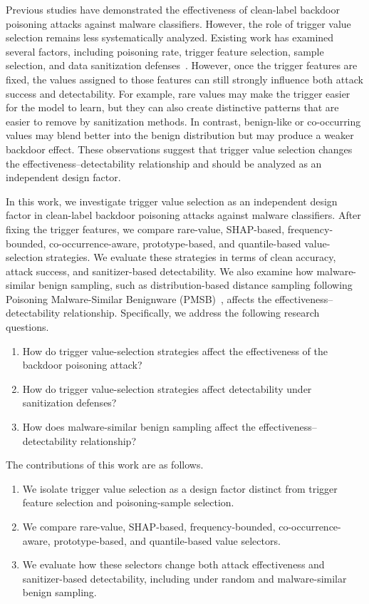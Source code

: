 Previous studies have demonstrated the effectiveness of clean-label backdoor poisoning attacks against malware classifiers. 
However, the role of trigger value selection remains less systematically analyzed. 
Existing work has examined several factors, including poisoning rate, trigger feature selection, sample selection, and data sanitization defenses~\cite{severi,ho_sanitization}.
However, once the trigger features are fixed, the values assigned to those features can still strongly influence both attack success and detectability.
For example, rare values may make the trigger easier for the model to learn, but they can also create distinctive patterns that are easier to remove by sanitization methods.
In contrast, benign-like or co-occurring values may blend better into the benign distribution but may produce a weaker backdoor effect.
These observations suggest that trigger value selection changes the effectiveness--detectability relationship and should be analyzed as an independent design factor.

In this work, we investigate trigger value selection as an independent design factor in clean-label backdoor poisoning attacks against malware classifiers.
After fixing the trigger features, we compare rare-value, SHAP-based, frequency-bounded, co-occurrence-aware, prototype-based, and quantile-based value-selection strategies.
We evaluate these strategies in terms of clean accuracy, attack success, and sanitizer-based detectability.
We also examine how malware-similar benign sampling, such as distribution-based distance sampling following Poisoning Malware-Similar Benignware (PMSB)~\cite{pmsb}, affects the effectiveness--detectability relationship.
Specifically, we address the following research questions.
\begin{enumerate}
    \item[RQ1)] How do trigger value-selection strategies affect the effectiveness of the backdoor poisoning attack?
    \item[RQ2)] How do trigger value-selection strategies affect detectability under sanitization defenses?
    \item[RQ3)] How does malware-similar benign sampling affect the effectiveness--detectability relationship?
\end{enumerate}

The contributions of this work are as follows.
\begin{enumerate}
    \item We isolate trigger value selection as a design factor distinct from trigger feature selection and poisoning-sample selection.
    \item We compare rare-value, SHAP-based, frequency-bounded, co-occurrence-aware, prototype-based, and quantile-based value selectors.
    \item We evaluate how these selectors change both attack effectiveness and sanitizer-based detectability, including under random and malware-similar benign sampling.
\end{enumerate}

